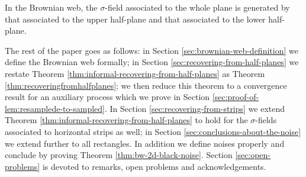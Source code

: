 {\begin{theorem}
\label{thm:informal-recovering-from-half-planes}
In the Brownian web, the $\sigma$-field associated to the whole plane
is generated by that associated to the upper half-plane and that
associated to the lower half-plane.
\end{theorem}

The rest of the paper goes as follows: in Section \ref{sec:brownian-web-definition} we define the
Brownian web formally; in Section \ref{sec:recovering-from-half-planes} we restate
Theorem \ref{thm:informal-recovering-from-half-planes} as
Theorem \ref{thm:recoveringfromhalfplanes}; we then reduce this theorem to a
convergence result for an auxiliary process which we prove in Section
\ref{sec:proof-of-lem:resamplede-to-sampled}.  In Section \ref{sec:recovering-from-strips} we extend Theorem \ref{thm:informal-recovering-from-half-planes} to hold for the
$\sigma$-fields associated to horizontal strips as well; in Section \ref{sec:conclusions-about-the-noise}
we extend further to all rectangles.  In addition we define noises
properly and conclude by proving Theorem \ref{thm:bw-2d-black-noise}.  Section \ref{sec:open-problems} is devoted to
remarks, open problems and acknowledgements.
}
